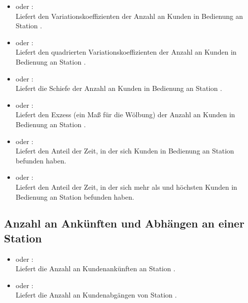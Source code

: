 \begin{itemize}
\item
{} oder :\\
Liefert den Variationskoeffizienten der Anzahl an Kunden in Bedienung an Station .

\item
{} oder :\\
Liefert den quadrierten Variationskoeffizienten der Anzahl an Kunden in Bedienung an Station .

\item
{} oder :\\
Liefert die Schiefe der Anzahl an Kunden in Bedienung an Station .

\item
{} oder :\\
Liefert den Exzess (ein Maß für die Wölbung) der Anzahl an Kunden in Bedienung an Station .

\item
{} oder :\\
Liefert den Anteil der Zeit, in der sich  Kunden in Bedienung an Station  befunden haben.

\item
{} oder :\\
Liefert den Anteil der Zeit, in der sich mehr als  und höchsten  Kunden in Bedienung an Station  befunden haben.

\end{itemize}  



\subsection{Anzahl an Ankünften und Abhängen an einer Station}

\begin{itemize}

\item
{} oder :\\
Liefert die Anzahl an Kundenankünften an Station .

\item
{} oder :\\
Liefert die Anzahl an Kundenabgängen von Station .

\end{itemize}  





